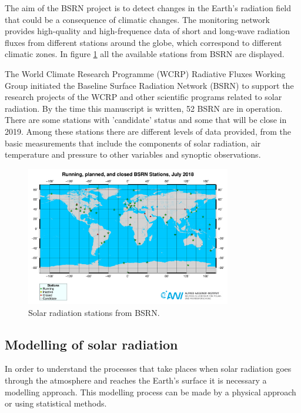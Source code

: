 The aim of the BSRN project is to detect changes in the Earth's radiation field that could be a consequence of climatic changes. The monitoring network provides high-quality and high-frequence data of short and long-wave radiation fluxes from different stations around the globe, which correspond to different climatic zones. In figure \ref{fig:bsrnstations} all the available stations from BSRN are displayed.

The World Climate Research Programme (WCRP) Radiative Fluxes Working Group initiated the Baseline Surface Radiation Network (BSRN) to support the research projects of the WCRP and other scientific programs related to solar radiation. By the time this manuscript is written, 52 BSRN are in operation. There are some stations with 'candidate' status and some that will be close in 2019. Among these stations there are different levels of data provided, from the basic measurements that include the components of solar radiation, air temperature and pressure to other variables and synoptic observations.

\begin{figure}[h]
  \centering
  \includegraphics[width=0.8\textwidth]{DataMethodsFIGS/bsrn.pdf}
  \caption{Solar radiation stations from BSRN.}
 \label{fig:bsrnstations}
\end{figure}

\subsection{Modelling of solar radiation}

In order to understand the processes that take places when solar radiation goes through the atmosphere and reaches the Earth's surface it is necessary a modelling approach. This modelling process can be made by a physical approach or using statistical methods.

